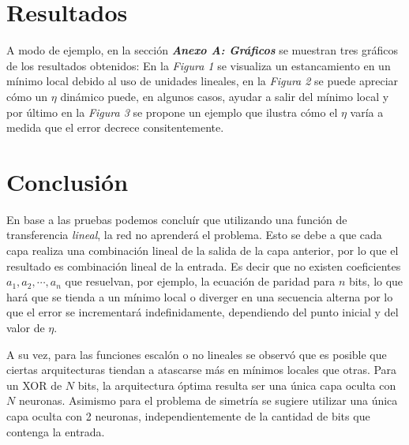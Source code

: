 \documentclass[%
    final,
    reprint,
    notitlepage,
    narroweqnarray,
    inline,
    twoside,
    invited
    ]{ieee}
\begin{document}
\section{Resultados}

\par A modo de ejemplo, en la sección \textit{\textbf{Anexo A: Gráficos}} se muestran tres gráficos de los resultados obtenidos: En la \textit{Figura 1} 
se visualiza un estancamiento en un mínimo local debido al uso de unidades lineales, en la \textit{Figura 2} se puede apreciar 
cómo un $\eta$ dinámico puede, en algunos casos, ayudar a salir del mínimo local y por último en la \textit{Figura 3} se propone un ejemplo 
que ilustra cómo el $\eta$ varía a medida que el error decrece consitentemente.


\section{Conclusión}

\par En base a las pruebas podemos concluír que utilizando una función de transferencia \textit{lineal}, la red no aprenderá el problema. 
Esto se debe a que cada capa realiza una combinación lineal de la salida de la capa anterior, por lo que el resultado es combinación lineal de la entrada. 
Es decir que no existen coeficientes $a_1, a_2, \cdots, a_n$ que resuelvan, por ejemplo, la ecuación de paridad para $n$ bits, 
lo que hará que se tienda a un mínimo local o diverger en una secuencia alterna por lo que el error se incrementará indefinidamente, dependiendo del 
punto inicial y del valor de $\eta$.\\

\par A su vez, para las funciones escalón o no lineales se observó que es posible que ciertas arquitecturas tiendan a atascarse más en mínimos 
locales que otras. Para un XOR de $N$ bits, la arquitectura óptima resulta ser una única capa oculta con $N$ neuronas. 
Asimismo para el problema de simetría se sugiere utilizar una única capa oculta con 2 neuronas, 
independientemente de la cantidad de bits que contenga la entrada.




\end{document}
